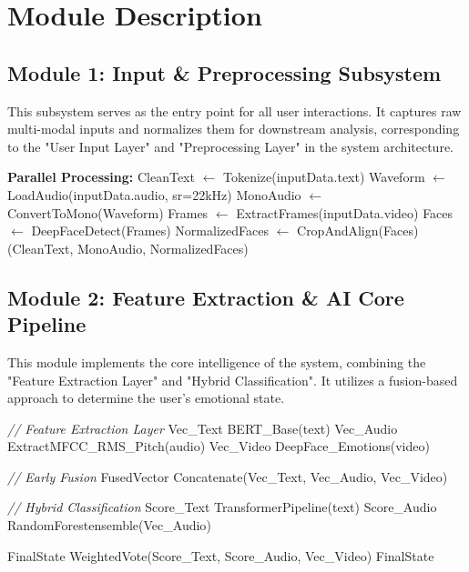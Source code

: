 \section{Module Description}

\subsection{Module 1: Input \& Preprocessing Subsystem}
This subsystem serves as the entry point for all user interactions. It captures raw multi-modal inputs and normalizes them for downstream analysis, corresponding to the "User Input Layer" and "Preprocessing Layer" in the system architecture.

\begin{algorithm}[H]
\caption{Input Preprocessing Algorithm}
\begin{algorithmic}[1]
    \State \textbf{Parallel Processing:}
        \State CleanText $\gets$ Tokenize(inputData.text)
    \EndIf
        \State Waveform $\gets$ LoadAudio(inputData.audio, sr=22kHz)
        \State MonoAudio $\gets$ ConvertToMono(Waveform)
    \EndIf
        \State Frames $\gets$ ExtractFrames(inputData.video)
        \State Faces $\gets$ DeepFaceDetect(Frames)
        \State NormalizedFaces $\gets$ CropAndAlign(Faces)
    \EndIf
    \State \Return (CleanText, MonoAudio, NormalizedFaces)
\EndProcedure
\end{algorithmic}
\end{algorithm}

\subsection{Module 2: Feature Extraction \& AI Core Pipeline}
This module implements the core intelligence of the system, combining the "Feature Extraction Layer" and "Hybrid Classification". It utilizes a fusion-based approach to determine the user's emotional state.

\begin{algorithm}[H]
\caption{Hybrid Classification Algorithm}
\begin{algorithmic}[1]
    \State \textit{// Feature Extraction Layer}
    \State Vec_{Text} \gets BERT\_Base(text) 
    \State Vec_{Audio} \gets ExtractMFCC\_RMS\_Pitch(audio) 
    \State Vec_{Video} \gets DeepFace\_Emotions(video) 
    
    \State \textit{// Early Fusion}
    \State FusedVector \gets Concatenate(Vec_{Text}, Vec_{Audio}, Vec_{Video})
    
    \State \textit{// Hybrid Classification}
    \State Score_{Text} \gets TransformerPipeline(text)
    \State Score_{Audio} \gets RandomForestensemble(Vec_{Audio})
    
    \State FinalState \gets WeightedVote(Score_{Text}, Score_{Audio}, Vec_{Video})
    \State \Return FinalState
\EndProcedure
\end{algorithmic}
\end{algorithm}


